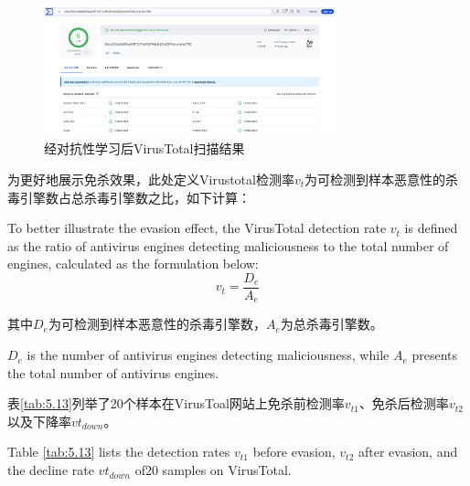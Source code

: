 \begin{figure}[htbp]
	\centering
	\includegraphics[width=0.75\textwidth]{figures/5.3}
	\caption{经对抗性学习后VirusTotal扫描结果}\label{fig:5.3}
\end{figure}


为更好地展示免杀效果，此处定义Virustotal检测率$v_t$为可检测到样本恶意性的杀毒引擎数占总杀毒引擎数之比，如下计算： 

To better illustrate the evasion effect, the VirusTotal detection rate $v_t$ is defined as the ratio of antivirus engines detecting maliciousness to the total number of engines, calculated as the formulation below:
\begin{equation}
v_t = \frac{D_e}{A_e}
\tag{5.9}
\end{equation}

其中$D_e$为可检测到样本恶意性的杀毒引擎数，$A_e$为总杀毒引擎数。

$D_e$ is the number of antivirus engines detecting maliciousness, while $A_e$ presents the total number of antivirus engines.

表\ref{tab:5.13}列举了20个样本在VirusToal网站上免杀前检测率$v_{t1}$、免杀后检测率$v_{t2}$以及下降率$vt_{down}$。

Table \ref{tab:5.13} lists the detection rates $v_{t1}$ before evasion, $v_{t2}$ after evasion, and the decline rate $vt_{down}$ of20 samples on VirusTotal.

